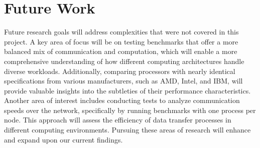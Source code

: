 \documentclass{article}
\begin{document}
\section{Future Work}
Future research goals will address complexities that were not covered in this project. A key area of focus will be on testing benchmarks that offer a more balanced mix of communication and computation, which will enable a more comprehensive understanding of how different computing architectures handle diverse workloads. Additionally, comparing processors with nearly identical specifications from various manufacturers, such as AMD, Intel, and IBM, will provide valuable insights into the subtleties of their performance characteristics. Another area of interest includes conducting tests to analyze communication speeds over the network, specifically by running benchmarks with one process per node. This approach will assess the efficiency of data transfer processes in different computing environments. Pursuing these areas of research will enhance and expand upon our current findings.
\printbibliography
\end{document}
